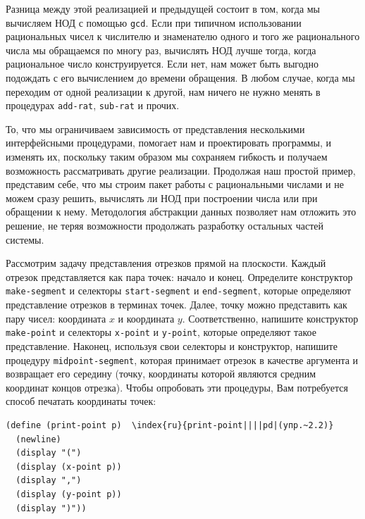Разница между этой реализацией и предыдущей состоит в том, когда мы
вычисляем НОД с помощью {\tt gcd}.  Если при типичном использовании
рациональных чисел к числителю и знаменателю одного и того же
рационального числа мы обращаемся по многу раз, вычислять НОД лучше
тогда, когда рациональное число конструируется.  Если нет, нам может
быть выгодно подождать с его вычислением до времени обращения.  В любом
случае, когда мы переходим от одной реализации к другой, нам ничего не 
нужно менять в процедурах {\tt add-rat}, {\tt sub-rat} и 
прочих.

То, что мы ограничиваем зависимость от представления
несколькими интерфейсными процедурами, помогает нам и проектировать
программы, и изменять их, поскольку таким образом мы сохраняем
гибкость и получаем возможность рассматривать другие реализации.
Продолжая наш простой пример, представим себе, что мы строим пакет
работы с рациональными числами и не можем сразу решить, вычислять ли
НОД при построении числа или при обращении к нему.  Методология
абстракции данных позволяет нам отложить это решение, не теряя
возможности продолжать разработку остальных частей системы.
\begin{exercise}{2.2}\label{EX2.2}%
%
%
Рассмотрим задачу представления отрезков прямой на
плоскости.  Каждый отрезок представляется как пара точек: начало и
конец.  Определите конструктор {\tt make-seg\-ment}
и селекторы {\tt start-segment}
и {\tt end-segment},
которые
определяют представление отрезков в терминах точек. 
Далее, точку можно представить как пару чисел: координата $x$ и
координата $y$.  Соответственно, напишите конструктор
{\tt make-point}
и селекторы {\tt x-point} и
{\tt y-point}, которые определяют такое представление.
Наконец, используя свои селекторы и конструктор, напишите процедуру
{\tt midpoint-segment}, которая принимает отрезок в качестве
аргумента и возвращает его середину (точку, координаты которой
являются средним координат концов отрезка).  Чтобы опробовать эти
процедуры, Вам потребуется способ печатать координаты точек:

\begin{Verbatim}[fontsize=\small]
(define (print-point p)  \index{ru}{print-point||||pd|(упр.~2.2)}
  (newline)
  (display "(")
  (display (x-point p))
  (display ",")
  (display (y-point p))
  (display ")"))
\end{Verbatim}

\end{exercise}

